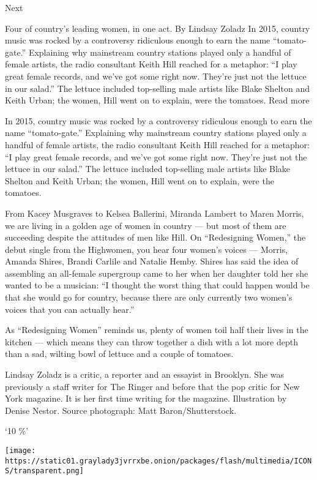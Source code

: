 Next

Four of country's leading women, in one act. By Lindsay Zoladz In 2015,
country music was rocked by a controversy ridiculous enough to earn the
name ``tomato-gate.'' Explaining why mainstream country stations played
only a handful of female artists, the radio consultant Keith Hill
reached for a metaphor: ``I play great female records, and we've got
some right now. They're just not the lettuce in our salad.'' The lettuce
included top-selling male artists like Blake Shelton and Keith Urban;
the women, Hill went on to explain, were the tomatoes. Read more

In 2015, country music was rocked by a controversy ridiculous enough to
earn the name ``tomato-gate.'' Explaining why mainstream country
stations played only a handful of female artists, the radio consultant
Keith Hill reached for a metaphor: ``I play great female records, and
we've got some right now. They're just not the lettuce in our salad.''
The lettuce included top-selling male artists like Blake Shelton and
Keith Urban; the women, Hill went on to explain, were the tomatoes.

From Kacey Musgraves to Kelsea Ballerini, Miranda Lambert to Maren
Morris, we are living in a golden age of women in country --- but most
of them are succeeding despite the attitudes of men like Hill. On
``Redesigning Women,'' the debut single from the Highwomen, you hear
four women's voices --- Morris, Amanda Shires, Brandi Carlile and
Natalie Hemby. Shires has said the idea of assembling an all-female
supergroup came to her when her daughter told her she wanted to be a
musician: ``I thought the worst thing that could happen would be that
she would go for country, because there are only currently two women's
voices that you can actually hear.''

As ``Redesigning Women'' reminds us, plenty of women toil half their
lives in the kitchen --- which means they can throw together a dish with
a lot more depth than a sad, wilting bowl of lettuce and a couple of
tomatoes.

Lindsay Zoladz is a critic, a reporter and an essayist in Brooklyn. She
was previously a staff writer for The Ringer and before that the pop
critic for New York magazine. It is her first time writing for the
magazine. Illustration by Denise Nestor. Source photograph: Matt
Baron/Shutterstock.

`10 \%'

\texttt{[image: https://static01.graylady3jvrrxbe.onion/packages/flash/multimedia/ICONS/transparent.png]}

